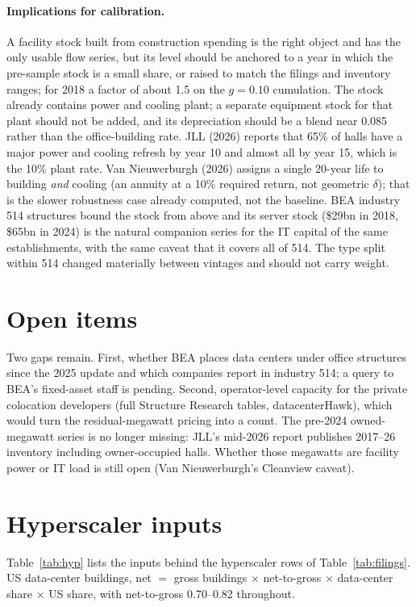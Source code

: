 \documentclass[11pt]{article}
\begin{document}
\paragraph{Implications for calibration.} A facility stock built from construction spending is the right object and has the only usable flow series, but its level should be anchored to a year in which the pre-sample stock is a small share, or raised to match the filings and inventory ranges; for 2018 a factor of about 1.5 on the $g=0.10$ cumulation. The stock already contains power and cooling plant; a separate equipment stock for that plant should not be added, and its depreciation should be a blend near 0.085 rather than the office-building rate. JLL (2026) reports that 65\% of halls have a major power and cooling refresh by year 10 and almost all by year 15, which is the 10\% plant rate. Van Nieuwerburgh (2026) assigns a single 20-year life to building \emph{and} cooling (an annuity at a 10\% required return, not geometric $\delta$); that is the slower robustness case already computed, not the baseline. BEA industry 514 structures bound the stock from above and its server stock (\$29bn in 2018, \$65bn in 2024) is the natural companion series for the IT capital of the same establishments, with the same caveat that it covers all of 514. The type split within 514 changed materially between vintages and should not carry weight.

\section{Open items}

Two gaps remain. First, whether BEA places data centers under office structures since the 2025 update and which companies report in industry 514; a query to BEA's fixed-asset staff is pending. Second, operator-level capacity for the private colocation developers (full Structure Research tables, datacenterHawk), which would turn the residual-megawatt pricing into a count. The pre-2024 owned-megawatt series is no longer missing: JLL's mid-2026 report publishes 2017--26 inventory including owner-occupied halls. Whether those megawatts are facility power or IT load is still open (Van Nieuwerburgh's Cleanview caveat).

\appendix
\section{Hyperscaler inputs}
\label{app:hyp}

Table~\ref{tab:hyp} lists the inputs behind the hyperscaler rows of Table~\ref{tab:filings}. US data-center buildings, net $=$ gross buildings $\times$ net-to-gross $\times$ data-center share $\times$ US share, with net-to-gross 0.70--0.82 throughout.
\end{document}
